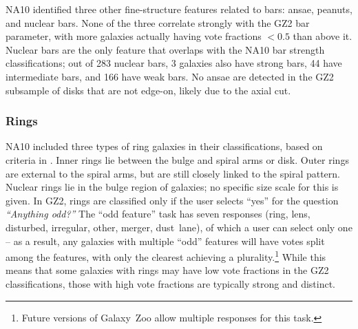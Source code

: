 \documentclass[useAMS,usenatbib]{mn2e}
\begin{document}
NA10 identified three other fine-structure features related to bars: ansae, peanuts, and nuclear bars. None of the three correlate strongly with the GZ2 bar parameter, with more galaxies actually having vote fractions $<0.5$ than above it. Nuclear bars are the only feature that overlaps with the NA10 bar strength classifications; out of 283 nuclear bars, 3 galaxies also have strong bars, 44 have intermediate bars, and 166 have weak bars. No ansae are detected in the GZ2 subsample of disks that are not edge-on, likely due to the axial cut. 



\subsubsection{Rings}

NA10 included three types of ring galaxies in their classifications, based on criteria in \citet{but96}. Inner rings lie between the bulge and spiral arms or disk. Outer rings are external to the spiral arms, but are still closely linked to the spiral pattern. Nuclear rings lie in the bulge region of galaxies; no specific size scale for this is given. In GZ2, rings are classified only if the user selects ``yes'' for the question {\it ``Anything odd?''} The ``odd feature'' task has seven responses (ring, lens, disturbed, irregular, other, merger, dust~lane), of which a user can select only one -- as a result, any galaxies with multiple ``odd'' features will have votes split among the features, with only the clearest achieving a plurality.\footnote{Future versions of Galaxy~Zoo allow multiple responses for this task.} While this means that some galaxies with rings may have low vote fractions in the GZ2 classifications, those with high vote fractions are typically strong and distinct.
\end{document}
